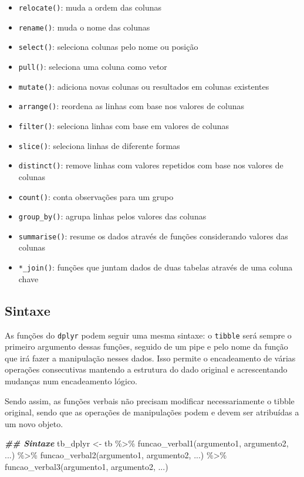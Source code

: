 \documentclass[
]{book}
\newenvironment{Shaded}{\begin{snugshade}}{\end{snugshade}}
\newcommand{\DocumentationTok}[1]{\textcolor[rgb]{0.37,0.37,0.37}{\textbf{\textit{#1}}}}
\newcommand{\FunctionTok}[1]{\textcolor[rgb]{0,0,0}{#1}}
\newcommand{\NormalTok}[1]{#1}
\newcommand{\OtherTok}[1]{\textcolor[rgb]{0.37,0.37,0.37}{#1}}
\newcommand{\SpecialCharTok}[1]{\textcolor[rgb]{0,0,0}{#1}}
\providecommand{\tightlist}{%
  \setlength{\itemsep}{0pt}\setlength{\parskip}{0pt}}
\begin{document}
\begin{itemize}
\tightlist
\item
  \texttt{relocate()}: muda a ordem das colunas
\item
  \texttt{rename()}: muda o nome das colunas
\item
  \texttt{select()}: seleciona colunas pelo nome ou posição
\item
  \texttt{pull()}: seleciona uma coluna como vetor
\item
  \texttt{mutate()}: adiciona novas colunas ou resultados em colunas existentes
\item
  \texttt{arrange()}: reordena as linhas com base nos valores de colunas
\item
  \texttt{filter()}: seleciona linhas com base em valores de colunas
\item
  \texttt{slice()}: seleciona linhas de diferente formas
\item
  \texttt{distinct()}: remove linhas com valores repetidos com base nos valores de colunas
\item
  \texttt{count()}: conta observações para um grupo
\item
  \texttt{group\_by()}: agrupa linhas pelos valores das colunas
\item
  \texttt{summarise()}: resume os dados através de funções considerando valores das colunas
\item
  \texttt{*\_join()}: funções que juntam dados de duas tabelas através de uma coluna chave
\end{itemize}

\hypertarget{sintaxe}{%
\subsection{Sintaxe}\label{sintaxe}}

As funções do \texttt{dplyr} podem seguir uma mesma sintaxe: o \texttt{tibble} será sempre o primeiro argumento dessas funções, seguido de um pipe e pelo nome da função que irá fazer a manipulação nesses dados. Isso permite o encadeamento de várias operações consecutivas mantendo a estrutura do dado original e acrescentando mudanças num encadeamento lógico.

Sendo assim, as funções verbais não precisam modificar necessariamente o tibble original, sendo que as operações de manipulações podem e devem ser atribuídas a um novo objeto.

\begin{Shaded}
\begin{Highlighting}[]
\DocumentationTok{\#\# Sintaxe}
\NormalTok{tb\_dplyr }\OtherTok{\textless{}{-}}\NormalTok{ tb }\SpecialCharTok{\%\textgreater{}\%} 
  \FunctionTok{funcao\_verbal1}\NormalTok{(argumento1, argumento2, ...) }\SpecialCharTok{\%\textgreater{}\%} 
  \FunctionTok{funcao\_verbal2}\NormalTok{(argumento1, argumento2, ...) }\SpecialCharTok{\%\textgreater{}\%} 
  \FunctionTok{funcao\_verbal3}\NormalTok{(argumento1, argumento2, ...)}
\end{Highlighting}
\end{Shaded}
\end{document}
